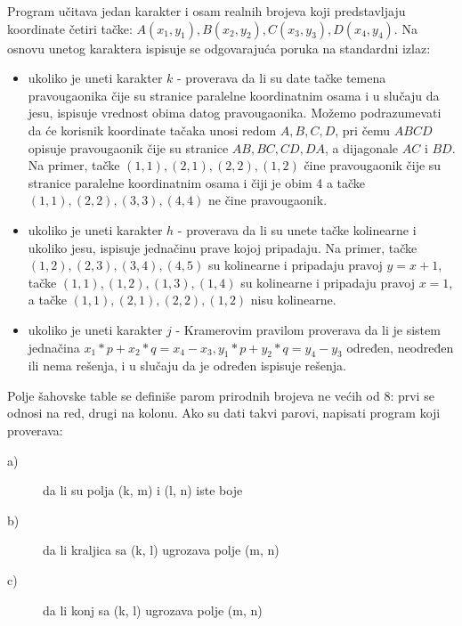 \begin{Exercise}[difficulty=1, label=v1.2_14] 
Program učitava jedan karakter i osam realnih brojeva koji predstavljaju 
koordinate četiri tačke: $A(x_1, y_1), B(x_2, y_2), C(x_3, y_3), D(x_4, y_4)$. Na osnovu unetog karaktera 
ispisuje se odgovarajuća poruka na standardni izlaz:
\begin{itemize}
\item ukoliko je uneti karakter $k$ - proverava da li su date tačke temena pravougaonika čije su stranice paralelne koordinatnim osama i 
    u slučaju da jesu, ispisuje vrednost obima datog pravougaonika. Možemo podrazumevati da će korisnik koordinate tačaka 
    unosi redom $A,B,C,D$, pri čemu $ABCD$ opisuje pravougaonik čije su stranice $AB,BC,CD,DA$, a dijagonale $AC$ i $BD$. 
    Na primer, tačke $(1,1),(2,1),(2,2),(1,2)$ čine pravougaonik čije su stranice paralelne koordinatnim osama i čiji je obim 4
    a tačke $(1,1),(2,2),(3,3),(4,4)$ ne čine pravougaonik. 
\item ukoliko je uneti karakter $h$ - proverava da li su unete tačke kolinearne i ukoliko jesu, ispisuje jednačinu prave kojoj pripadaju. 
    Na primer, tačke $(1,2),(2,3),(3,4),(4,5)$ su kolinearne i pripadaju pravoj $y=x+1$, 
    tačke $(1,1),(1,2),(1,3),(1,4)$ su kolinearne i pripadaju pravoj $x=1$,
    a tačke $(1,1),(2,1),(2,2),(1,2)$ nisu kolinearne.
\item ukoliko je uneti karakter $j$ - Kramerovim pravilom proverava da li je sistem jednačina
$x_1 * p + x_2 * q = x_4 - x_3,y_1 * p + y_2 * q = y_4 - y_3$
    određen, neodređen ili nema rešenja, i u slučaju da je određen ispisuje rešenja.
\end{itemize} 
\end{Exercise}
\begin{Answer}[ref=v1.2_14]
\end{Answer}


\begin{Exercise}[label=p1_21]
Polje šahovske table se definiše parom prirodnih brojeva ne većih od $8$: prvi se odnosi na red, drugi na kolonu. Ako su dati takvi
parovi, napisati program koji proverava: \\
\begin{description}
\item[a)] da li su polja (k, m) i (l, n) iste boje
\item[b)] da li kraljica sa (k, l) ugrozava polje (m, n)
\item[c)] da li konj sa (k, l) ugrozava polje (m, n)
\end{description}

\end{Exercise}




